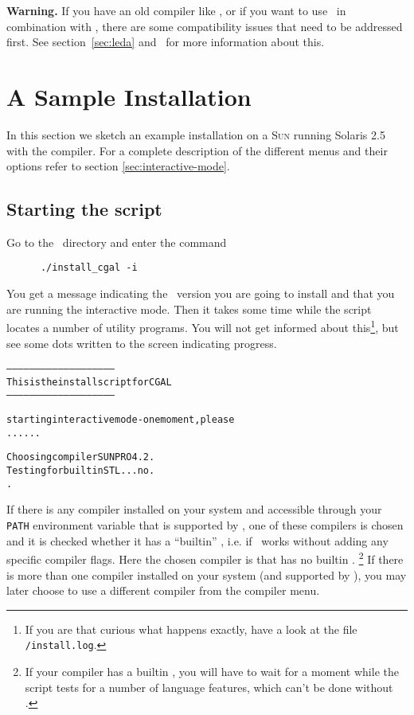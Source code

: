 \textbf{Warning.} If you have an old compiler like , or if
you want to use \leda\ in combination with \cgal, there are some
compatibility issues that need to be addressed first. See
section~\ref{sec:leda} and \compilerpage\ for more information about
this.

\section{A Sample Installation \label{sec:sample-inst}}

In this section we sketch an example installation on a \textsc{Sun}
running Solaris 2.5 with the  compiler. For a complete
description of the different menus and their options refer to section
\ref{sec:interactive-mode}.

\subsection{Starting the script}

Go to the \cgaldir\ directory and enter the command
\begin{verbatim}
      ./install_cgal -i
\end{verbatim}

You get a message indicating the \cgal\ version you are going to
install and that you are running the interactive mode. Then it takes
some time while the script locates a number of utility programs. You
will not get informed about this\footnote{If you are that curious what
  happens exactly, have a look at the file
  \texttt{\cgaldir/install.log}.}, but see some dots written to the
screen indicating progress.

\begin{scriptsize}
\begin{alltt}
--------------------------------------------------------
  This is the install script for CGAL \cgalrelease
--------------------------------------------------------

starting interactive mode - one moment, please
......

  Choosing compiler SUNPRO 4.2.
  Testing for builtin STL ... no.
.
\end{alltt}
\end{scriptsize}
  
If there is any compiler installed on your system and accessible
through your \texttt{PATH} environment variable that is supported by
\cgal, one of these compilers is chosen and it is checked whether it
has a ``builtin'' \stl, i.e. if \stl\ works without adding any
specific compiler flags.  Here the chosen compiler is 
that has no builtin \stl.  \footnote{If your compiler has a builtin
  \stl, you will have to wait for a moment while the script tests for
  a number of language features, which can't be done without \stl.} If
there is more than one compiler installed on your system (and
supported by \cgal), you may later choose to use a different compiler
from the compiler menu.

